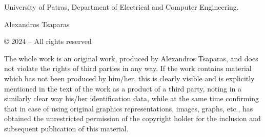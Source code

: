 \thispagestyle{empty}

\vspace*{\fill}
\noindent University of Patras, Department of Electrical and Computer Engineering.

\vspace{3mm}

\noindent Alexandros Tsaparas

\vspace{3mm}

\noindent © 2024 – All rights reserved

\vspace{5mm}

\noindent The whole work is an original work, produced by Alexandros Tsaparas, and does not violate the rights of third parties in any way. If the work contains material which has not been produced by him/her, this is clearly visible and is explicitly mentioned in the text of the work as a product of a third party, noting in a similarly clear way his/her identification data, while at the same time confirming that in case of using original graphics representations, images, graphs, etc., has obtained the unrestricted permission of the copyright holder for the inclusion and subsequent publication of this material.

\thispagestyle{empty}
